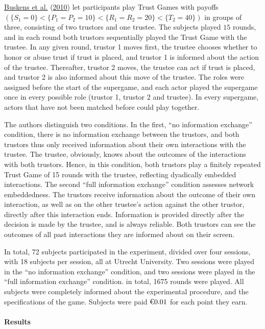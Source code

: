 \documentclass[
  11pt,
]{article}
\begin{document}
\protect\hyperlink{ref-buskens_raub_veer_triads_2010}{Buskens et al.} (\protect\hyperlink{ref-buskens_raub_veer_triads_2010}{2010}) let participants play Trust Games with payoffs \((\{S_1 = 0\} < \{P_1 = P_2 = 10\} < \{R_1 = R_2 = 20\} < \{T_2 = 40\})\) in groups of three, consisting of two trustors and one trustee. The subjects played \(15\) rounds, and in each round both trustors sequentially played the Trust Game with the trustee. In any given round, trustor 1 moves first, the trustee chooses whether to honor or abuse trust if trust is placed, and trustor 1 is informed about the action of the trustee. Thereafter, trustor 2 moves, the trustee can act if trust is placed, and trustor 2 is also informed about this move of the trustee. The roles were assigned before the start of the supergame, and each actor played the supergame once in every possible role (trustor 1, trustor 2 and trustee). In every supergame, actors that have not been matched before could play together.

The authors distinguish two conditions. In the first, ``no information exchange'' condition, there is no information exchange between the trustors, and both trustors thus only received information about their own interactions with the trustee. The trustee, obviously, knows about the outcomes of the interactions with both trustors. Hence, in this condition, both trustors play a finitely repeated Trust Game of 15 rounds with the trustee, reflecting dyadically embedded interactions.
The second ``full information exchange'' condition assesses network embeddedness.
The trustors receive information about the outcome of their own interaction, as well as on the other trustee's action against the other trustor, directly after this interaction ends.
Information is provided directly after the decision is made by the trustee, and is always reliable. Both trustors can see the outcomes of all past interactions they are informed about on their screen.

In total, 72 subjects participated in the experiment, divided over four sessions, with 18 subjects per session, all at Utrecht University. Two sessions were played in the ``no information exchange'' condition, and two sessions were played in the ``full information exchange'' condition. in total, 1675 rounds were played. All subjects were completely informed about the experimental procedure, and the specifications of the game. Subjects were paid \(\text{\texteuro}0.01\) for each point they earn.

\hypertarget{results-5}{%
\paragraph{Results}\label{results-5}}
\end{document}
